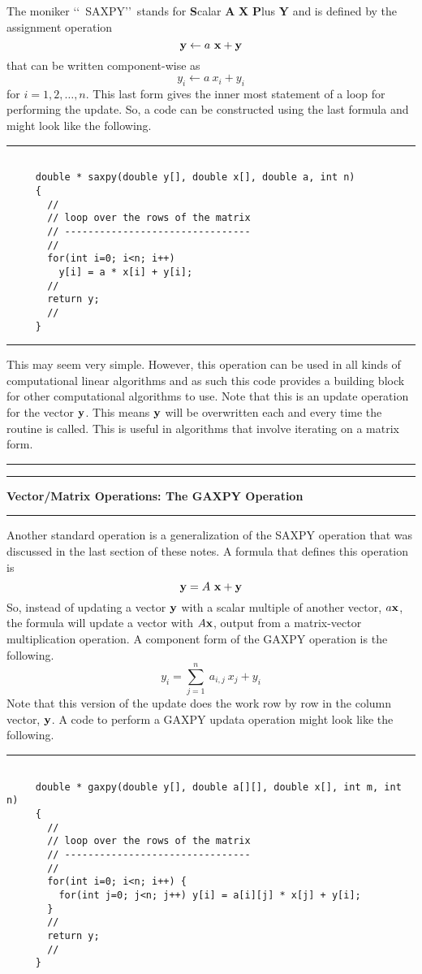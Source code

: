 \documentclass[10pt,fleqn]{article}
\begin{document}
The moniker \lq\lq\ SAXPY\rq\rq\ stands for {\bf S}calar {\bf A} {\bf X}
{\bf P}lus {\bf Y} and is defined by the assignment operation
$$
  {\bf y} \leftarrow a\ {\bf x} + {\bf y}
$$ 
that can be written component-wise as
$$
  y_i \leftarrow a\ x_i + y_i
$$ 
for $i=1,2,\ldots, n$. This last form gives the inner most statement of a loop
for performing the update. So, a code can be constructed using the last formula
and might look like the following.
\vskip0.1in\hrule\vskip0.1in
\begin{verbatim}

     double * saxpy(double y[], double x[], double a, int n)
     {
       //
       // loop over the rows of the matrix
       // --------------------------------
       //
       for(int i=0; i<n; i++)
         y[i] = a * x[i] + y[i];
       //
       return y;
       //
     }

\end{verbatim}
\vskip0.1in\hrule\vskip0.1in
This may seem very simple. However, this operation can be used in all kinds of
computational linear algorithms and as such this code provides a building block
for other computational algorithms to use. Note that this is an update operation
for the vector ${\bf y}$. This means ${\bf y}$ will be overwritten each and
every time the routine is called. This is useful in algorithms that involve
iterating on a matrix form.
\vskip0.1in\hrule\vskip0.1in
\newpage
\vskip0.1in\hrule\vskip0.1in
\noindent
{\bf Vector/Matrix Operations: The GAXPY Operation}
\vskip0.1in\hrule\vskip0.1in
\noindent
Another standard operation is a generalization of the SAXPY operation that was
discussed in the last section of these notes. A formula that defines this
operation is
$$
  {\bf y} = A\ {\bf x} + {\bf y}
$$
So, instead of updating a vector ${\bf y}$ with a scalar multiple of another
vector, $a{\bf x}$, the formula will update a vector with $A{\bf x}$, output
from a matrix-vector multiplication operation. A component form of the GAXPY
operation is the following.
$$
  y_i = \sum_{j=1}^n\ a_{i,j}\ x_j + y_i
$$
Note that this version of the update does the work row by row in the column
vector, ${\bf y}$. A code to perform a GAXPY updata operation might look like
the following.
\vskip0.1in\hrule\vskip0.1in
\begin{verbatim}

     double * gaxpy(double y[], double a[][], double x[], int m, int n)
     {
       //
       // loop over the rows of the matrix
       // --------------------------------
       //
       for(int i=0; i<n; i++) {
         for(int j=0; j<n; j++) y[i] = a[i][j] * x[j] + y[i];
       }
       //
       return y;
       //
     }

\end{verbatim}
\end{document}
